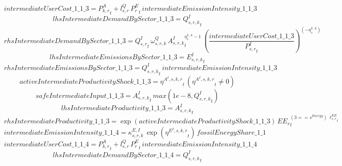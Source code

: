 \begin{dmath*}
intermediateUserCost\_1\_1\_3 = {{P^{A}_{k,r}}}_{t}+{{l^{Q}_{s,r}}}\, {{P^E_r}}_{t}\, {intermediateEmissionIntensity\_1\_1\_3}
\end{dmath*}
\begin{dmath*}
lhsIntermediateDemandBySector\_1\_1\_3 = {{Q^{I}_{s,r,k}}}_{t}
\end{dmath*}
\begin{dmath*}
rhsIntermediateDemandBySector\_1\_1\_3 = {{Q^{I}_{s,r}}}_{t}\, {{\omega^{Q}_{s,r,k}}}\, {{A^{I}_{s,r,k}}}_{t}^{{{\eta^{I,A}_{s}}}-1}\, \left(\frac{{intermediateUserCost\_1\_1\_3}}{{{P^{I}_{s,r}}}_{t}}\right)^{\left(-{{\eta^{I,A}_{s}}}\right)}
\end{dmath*}
\begin{dmath*}
lhsIntermediateEmissionsBySector\_1\_1\_3 = {{E^I_{s,r,k}}}_{t}
\end{dmath*}
\begin{dmath*}
rhsIntermediateEmissionsBySector\_1\_1\_3 = {{Q^{I}_{s,r,k}}}_{t}\, {intermediateEmissionIntensity\_1\_1\_3}
\end{dmath*}
\begin{dmath*}
activeIntermediateProductivityShock\_1\_1\_3 = {{\eta^{A^{I},s,k,r}}}_{t}\, \left({{\eta^{A^{I},s,k,r}}}_{t}\neq 0\right)
\end{dmath*}
\begin{dmath*}
safeIntermediateInput\_1\_1\_3 = {{A^{I}_{s,r,k}}}_{t}\, max(1e-8,{{Q^{I}_{s,r,k}}}_{t})
\end{dmath*}
\begin{dmath*}
lhsIntermediateProductivity\_1\_1\_3 = {{A^{I}_{s,r,k}}}_{t}
\end{dmath*}
\begin{dmath*}
rhsIntermediateProductivity\_1\_1\_3 = \exp\left({activeIntermediateProductivityShock\_1\_1\_3}\right)\, {{EE_r}}_{t}^{\left(3=={{s^{Energy}}}\right)\, {{\ell^{EE}_{s,r}}}_{t}}
\end{dmath*}
\begin{dmath*}
intermediateEmissionIntensity\_1\_1\_4 = {{\kappa^{E,I}_{s,r,k}}}\, \exp\left({{\eta^{E^{I},s,k,r}}}_{t}\right)\, {fossilEnergyShare\_1\_1}
\end{dmath*}
\begin{dmath*}
intermediateUserCost\_1\_1\_4 = {{P^{A}_{k,r}}}_{t}+{{l^{Q}_{s,r}}}\, {{P^E_r}}_{t}\, {intermediateEmissionIntensity\_1\_1\_4}
\end{dmath*}
\begin{dmath*}
lhsIntermediateDemandBySector\_1\_1\_4 = {{Q^{I}_{s,r,k}}}_{t}
\end{dmath*}
